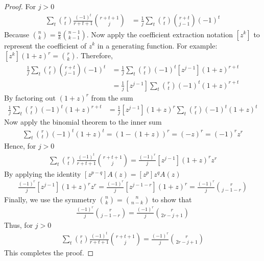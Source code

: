 \begin{lemma}
\begin{proof}
        For $j > 0$
        \begin{align*}
            \sum_t \binom{r}{t} \frac{(-1)^t}{r+t+1} \binom{r+t+1}{j}
            &= \frac{1}{j} \sum_t \binom{r}{t} \binom{r+t}{j-1} (-1)^t
        \end{align*}
        Because $\binom{n}{k} = \frac{n}{k} \binom{n-1}{k-1}$.
        Now apply the coefficient extraction notation $[z^k]$ to represent the coefficient of $z^k$
        in a generating function.
        For example: $[z^k] (1+z)^r = \binom{r}{k}$.
        Therefore,
        \begin{align*}
            \frac{1}{j} \sum_t \binom{r}{t} \binom{r+t}{j-1} (-1)^t
            &= \frac{1}{j} \sum_t \binom{r}{t} (-1)^t [z^{j-1}] (1+z)^{r+t} \\
            &= \frac{1}{j} [z^{j-1}] \sum_t \binom{r}{t} (-1)^t (1+z)^{r+t}
        \end{align*}
        By factoring out $(1+z)^r$ from the sum
        \begin{align*}
        [z^{j-1}]
            \frac{1}{j} \sum_t \binom{r}{t} (-1)^t (1+z)^{r+t}
            &= \frac{1}{j} [z^{j-1}] (1+z)^r \sum_t \binom{r}{t} (-1)^t (1+z)^t
        \end{align*}
        Now apply the binomial theorem to the inner sum
        \begin{align*}
            \sum_t \binom{r}{t} (-1)^t (1+z)^t = \left(1 - (1+z)\right)^r = (-z)^r = (-1)^r z^r
        \end{align*}
        Hence, for $j>0$
        \begin{align*}
            \sum_t \binom{r}{t} \frac{(-1)^t}{r+t+1} \binom{r+t+1}{j} = \frac{(-1)^r}{j} [z^{j-1}] (1+z)^r z^r
        \end{align*}
        By applying the identity $[z^{p-q}]A(z)=[z^p]z^qA(z)$
        \begin{align*}
            \frac{(-1)^r}{j}  [z^{j-1}] (1+z)^r z^r = \frac{(-1)^r}{j}  [z^{j-1-r}] (1+z)^r = \frac{(-1)^r}{j} \binom{r}{j - 1 - r}
        \end{align*}
        Finally, we use the symmetry $\binom{n}{k} = \binom{n}{n-k}$ to show that
        \begin{align*}
            \frac{(-1)^r}{j} \binom{r}{j - 1 - r} = \frac{(-1)^r}{j} \binom{r}{2r - j + 1}
        \end{align*}
        Thus, for $j > 0$
        \begin{align*}
            \sum_t \binom{r}{t} \frac{(-1)^t}{r+t+1} \binom{r+t+1}{j}
            = \frac{(-1)^r}{j} \binom{r}{2r - j + 1}
        \end{align*}
        This completes the proof.
    \end{proof}
\end{lemma}

